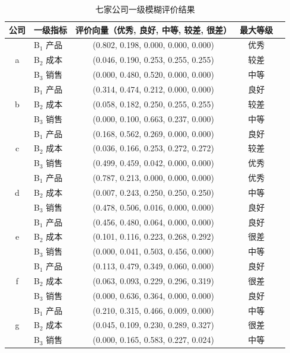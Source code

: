 \documentclass[a4paper,12pt]{ctexart}
\begin{document}
\begin{table}[H]
\centering
\caption{七家公司一级模糊评价结果}
\label{tab:first_level}
\small
\begin{tabular}{clccc}
\toprule
公司 & 一级指标 & 评价向量（优秀, 良好, 中等, 较差, 很差） & 最大等级 \\
\midrule
\multirow{3}{*}{a}
    & B$_1$ 产品 & (0.802, 0.198, 0.000, 0.000, 0.000) & 优秀 \\
    & B$_2$ 成本 & (0.046, 0.190, 0.253, 0.255, 0.255) & 较差 \\
    & B$_3$ 销售 & (0.000, 0.480, 0.520, 0.000, 0.000) & 中等 \\
\midrule
\multirow{3}{*}{b}
    & B$_1$ 产品 & (0.314, 0.474, 0.212, 0.000, 0.000) & 良好 \\
    & B$_2$ 成本 & (0.058, 0.182, 0.250, 0.255, 0.255) & 较差 \\
    & B$_3$ 销售 & (0.000, 0.100, 0.663, 0.237, 0.000) & 中等 \\
\midrule
\multirow{3}{*}{c}
    & B$_1$ 产品 & (0.168, 0.562, 0.269, 0.000, 0.000) & 良好 \\
    & B$_2$ 成本 & (0.036, 0.166, 0.253, 0.272, 0.272) & 较差 \\
    & B$_3$ 销售 & (0.499, 0.459, 0.042, 0.000, 0.000) & 优秀 \\
\midrule
\multirow{3}{*}{d}
    & B$_1$ 产品 & (0.787, 0.213, 0.000, 0.000, 0.000) & 优秀 \\
    & B$_2$ 成本 & (0.007, 0.243, 0.250, 0.250, 0.250) & 中等 \\
    & B$_3$ 销售 & (0.478, 0.506, 0.016, 0.000, 0.000) & 良好 \\
\midrule
\multirow{3}{*}{e}
    & B$_1$ 产品 & (0.456, 0.480, 0.064, 0.000, 0.000) & 良好 \\
    & B$_2$ 成本 & (0.101, 0.116, 0.223, 0.268, 0.292) & 很差 \\
    & B$_3$ 销售 & (0.000, 0.041, 0.503, 0.456, 0.000) & 中等 \\
\midrule
\multirow{3}{*}{f}
    & B$_1$ 产品 & (0.113, 0.479, 0.349, 0.060, 0.000) & 良好 \\
    & B$_2$ 成本 & (0.063, 0.093, 0.229, 0.296, 0.319) & 很差 \\
    & B$_3$ 销售 & (0.000, 0.636, 0.364, 0.000, 0.000) & 良好 \\
\midrule
\multirow{3}{*}{g}
    & B$_1$ 产品 & (0.210, 0.315, 0.466, 0.009, 0.000) & 中等 \\
    & B$_2$ 成本 & (0.045, 0.109, 0.230, 0.289, 0.327) & 很差 \\
    & B$_3$ 销售 & (0.000, 0.165, 0.583, 0.227, 0.024) & 中等 \\
\bottomrule
\end{tabular}
\end{table}
\end{document}
